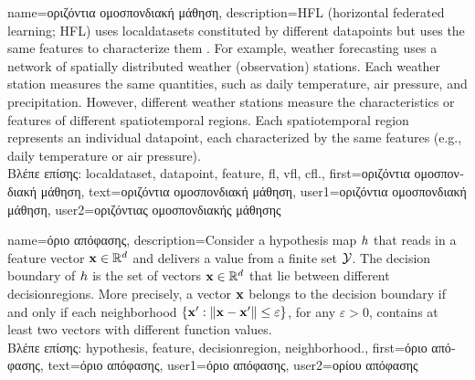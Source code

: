 {name={\foreignlanguage{greek}{οριζόντια ομοσπονδιακή μάθηση}},
	description={HFL (horizontal federated learning; HFL) uses \gls{localdataset}s constituted by different
	   	\gls{datapoint}s but uses the same \gls{feature}s to characterize them \cite{HFLChapter2020}.
		For example, weather forecasting uses a network of spatially distributed
		weather (observation) stations. Each weather station measures the
		same quantities, such as daily temperature, air pressure, and precipitation.
		However, different weather stations measure the characteristics or
		\gls{feature}s of different spatiotemporal regions. Each spatiotemporal region 
		represents an individual \gls{datapoint}, each characterized by the same \gls{feature}s 
		(e.g., daily temperature or air pressure).\\
		\foreignlanguage{greek}{Βλέπε επίσης:} \gls{localdataset}, \gls{datapoint}, \gls{feature}, \gls{fl}, \gls{vfl}, \gls{cfl}.},
	first={\foreignlanguage{greek}{οριζόντια ομοσπονδιακή μάθηση}},
	text={\foreignlanguage{greek}{οριζόντια ομοσπονδιακή μάθηση}},
	user1={\foreignlanguage{greek}{οριζόντια ομοσπονδιακή μάθηση}}, %
	user2={\foreignlanguage{greek}{οριζόντιας ομοσπονδιακής μάθησης}} %
} 

{name={\foreignlanguage{greek}{όριο απόφασης}}, 
	description={Consider a 
		\gls{hypothesis} map $h$ that reads in a \gls{feature} vector 
		${\bf x} \in \mathbb{R}^{d}$ and delivers a value from a finite set $\mathcal{Y}$. 
		The decision boundary of $h$ is the set of vectors ${\bf x} \in \mathbb{R}^{d}$ 
		that lie between different \gls{decisionregion}s. More precisely, a 
		vector ${\bf x}$ belongs to the decision boundary if and only 
		if each \gls{neighborhood} $\{ {\bf x}': \| {\bf x} - {\bf x}' \| \leq \varepsilon \}$, 
		for any $\varepsilon >0$, contains at least two vectors with different function values.\\
		\foreignlanguage{greek}{Βλέπε επίσης:} \gls{hypothesis}, \gls{feature}, \gls{decisionregion}, \gls{neighborhood}.},
		first={\foreignlanguage{greek}{όριο απόφασης}},
		text={\foreignlanguage{greek}{όριο απόφασης}},
		user1={\foreignlanguage{greek}{όριο απόφασης}}, %
		user2={\foreignlanguage{greek}{ορίου απόφασης}} %
}

